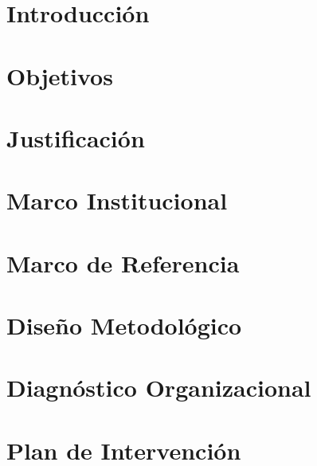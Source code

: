 \documentclass[12pt]{article}
\newcommand{\chapterbreak}{\clearpage \thispagestyle{fancy}}
\begin{document}
\chapterbreak
\tableofcontents
\newpage
\listoffigures
\listoftables


\chapterbreak
\section{Introducción}


\chapterbreak
\section{Objetivos}


\chapterbreak
\section{Justificación}


\chapterbreak
\section{Marco Institucional}


\chapterbreak
\section{Marco de Referencia}


\chapterbreak
\section{Diseño Metodológico}


\chapterbreak
\section{Diagnóstico Organizacional}


\chapterbreak
\section{Plan de Intervención}


\chapterbreak
\end{document}

